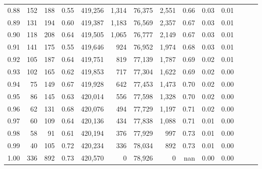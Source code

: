 \begin{tabular}{rrrrrrrrrrrrrr}
0.88 &     152 &    188 &  0.55 &  419,256 &    1,314 &  76,375 &   2,551 &  0.66 &  0.03 &      0.01 \\
0.89 &     131 &    194 &  0.60 &  419,387 &    1,183 &  76,569 &   2,357 &  0.67 &  0.03 &      0.01 \\
0.90 &     118 &    208 &  0.64 &  419,505 &    1,065 &  76,777 &   2,149 &  0.67 &  0.03 &      0.01 \\
0.91 &     141 &    175 &  0.55 &  419,646 &      924 &  76,952 &   1,974 &  0.68 &  0.03 &      0.01 \\
0.92 &     105 &    187 &  0.64 &  419,751 &      819 &  77,139 &   1,787 &  0.69 &  0.02 &      0.01 \\
0.93 &     102 &    165 &  0.62 &  419,853 &      717 &  77,304 &   1,622 &  0.69 &  0.02 &      0.00 \\
0.94 &      75 &    149 &  0.67 &  419,928 &      642 &  77,453 &   1,473 &  0.70 &  0.02 &      0.00 \\
0.95 &      86 &    145 &  0.63 &  420,014 &      556 &  77,598 &   1,328 &  0.70 &  0.02 &      0.00 \\
0.96 &      62 &    131 &  0.68 &  420,076 &      494 &  77,729 &   1,197 &  0.71 &  0.02 &      0.00 \\
0.97 &      60 &    109 &  0.64 &  420,136 &      434 &  77,838 &   1,088 &  0.71 &  0.01 &      0.00 \\
0.98 &      58 &     91 &  0.61 &  420,194 &      376 &  77,929 &     997 &  0.73 &  0.01 &      0.00 \\
0.99 &      40 &    105 &  0.72 &  420,234 &      336 &  78,034 &     892 &  0.73 &  0.01 &      0.00 \\
1.00 &     336 &    892 &  0.73 &  420,570 &        0 &  78,926 &       0 &   nan &  0.00 &      0.00 \\
\bottomrule
\end{tabular}
